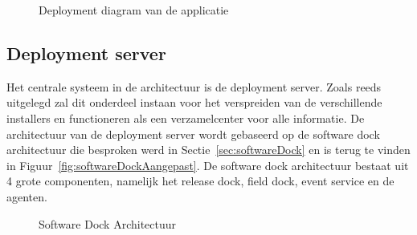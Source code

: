 \begin{figure}[!ht]
\centering
{}
\caption{Deployment diagram van de applicatie}
\label{fig:deploymentDiagram}
\end{figure}

\subsection{Deployment server}
Het centrale systeem in de architectuur is de deployment server.
Zoals reeds uitgelegd zal dit onderdeel instaan voor het verspreiden van de verschillende installers en functioneren als een verzamelcenter voor alle informatie.
De architectuur van de deployment server wordt gebaseerd op de software dock architectuur die besproken werd in Sectie~\vref{sec:softwareDock} en is terug te vinden in Figuur~\vref{fig:softwareDockAangepast}.
De software dock architectuur bestaat uit 4 grote componenten, namelijk het release dock, field dock, event service en de agenten.

\begin{figure}[!ht]
\centering
{}
\caption{Software Dock Architectuur \citep{hall1999cooperative}}
\label{fig:softwareDockAangepast}
\end{figure}

